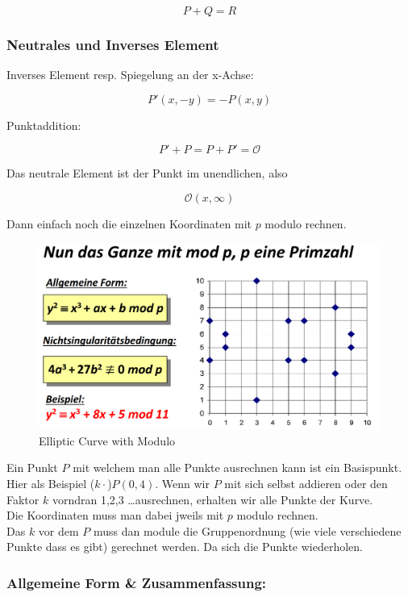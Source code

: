 \documentclass[12pt]{scrartcl}
\begin{document}
\[ P + Q = R \]


\subsubsection{Neutrales und Inverses Element}

Inverses Element resp. Spiegelung an der x-Achse:

\[ P'(x,-y) = -P(x,y) \]

Punktaddition:

\[ P' + P = P + P' = \mathcal{O} \]

Das neutrale Element ist der Punkt im unendlichen, also

\[ \mathcal{O}(x,\infty) \] 

Dann einfach noch die einzelnen Koordinaten mit $p$ modulo rechnen.


\begin{figure}[ht]
    \centering
    \includegraphics[width=\textwidth]{img/elliptic_curve_mod.png}
    \caption{Elliptic Curve with Modulo}
    \label{fig:elliptic_curve_mod}
\end{figure}

Ein Punkt $P$ mit welchem man alle Punkte ausrechnen kann ist ein Basispunkt. Hier als
Beispiel ($k \cdot $)$P(0,4)$. Wenn wir $P$ mit sich selbst addieren oder den Faktor $k$
vorndran 1,2,3 \dots ausrechnen, erhalten wir alle Punkte der Kurve.\\

Die Koordinaten muss man dabei jweils mit $p$ modulo rechnen.\\

Das $k$ vor dem $P$ muss dan module die Gruppenordnung (wie viele verschiedene 
Punkte dass es gibt) gerechnet werden. Da sich die Punkte wiederholen.



\newpage
\subsubsection{Allgemeine Form \& Zusammenfassung:}
\end{document}
